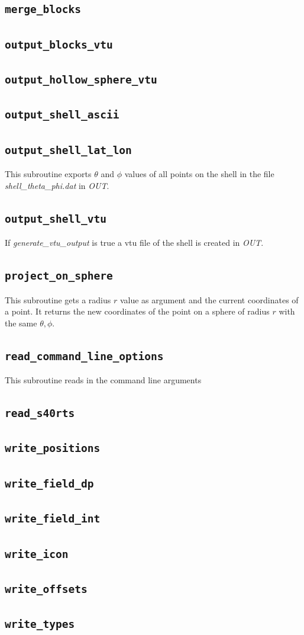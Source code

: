  \subsection{\tt merge\_blocks}
 \subsection{\tt output\_blocks\_vtu}
 \subsection{\tt output\_hollow\_sphere\_vtu}
 \subsection{\tt output\_shell\_ascii}
 \subsection{\tt output\_shell\_lat\_lon}
 This subroutine exports $\theta$ and $\phi$ values of all points on the 
 shell in the file {\sl shell\_theta\_phi.dat} in {\sl OUT}.
 \subsection{\tt output\_shell\_vtu}
 If {\sl generate\_vtu\_output} is true 
 a vtu file of the shell is created in {\sl OUT}.
 \subsection{\tt project\_on\_sphere}
 This subroutine gets a radius $r$ value as argument and the current coordinates
 of a point. It returns the new coordinates of the point on a sphere 
 of radius $r$ with the same $\theta,\phi$.
 \subsection{\tt read\_command\_line\_options}
 This subroutine reads in the command line arguments
 \subsection{\tt read\_s40rts}
 \subsection{\tt }
 \subsection{\tt write\_positions}
 \subsection{\tt write\_field\_dp}
 \subsection{\tt write\_field\_int}
 \subsection{\tt write\_icon}
 \subsection{\tt write\_offsets}
 \subsection{\tt write\_types}
